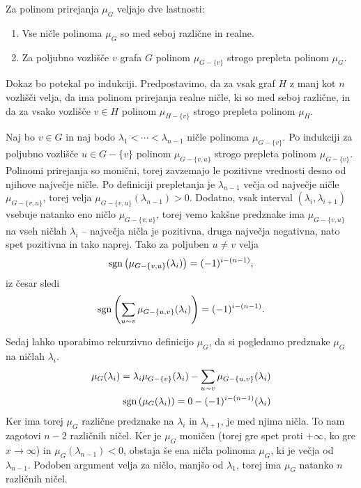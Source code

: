 \begin{izrek}
    Za polinom prirejanja \(\mu_G\) veljajo dve lastnosti:
    \begin{enumerate}
        \item Vse ničle polinoma \(\mu_G\) so med seboj različne in realne.
        \item Za poljubno vozlišče \(v\) grafa \(G\) polinom \(\mu_{G-\{v\}}\) strogo prepleta polinom \(\mu_G\).
    \end{enumerate}
\end{izrek}
\begin{dokaz}
    Dokaz bo potekal po indukciji. Predpostavimo, da za vsak graf \(H\) z manj kot \(n\) vozlišči velja, da ima polinom prirejanja realne ničle, ki so med seboj različne, in da za vsako vozlišče \(v\in H\) polinom \(\mu_{H-\{v\}}\) strogo prepleta polinom \(\mu_H\).

    Naj bo \(v\in G\) in naj bodo \(\lambda_1 < \cdots < \lambda_{n-1}\) ničle polinoma \(\mu_{G-\{v\}}\). Po indukciji za poljubno vozlišče \(u\in G-\{v\}\) polinom \(\mu_{G-\{v, u\}}\) strogo prepleta polinom \(\mu_{G-\{v\}}\). Polinomi prirejanja so monični, torej zavzemajo le pozitivne vrednosti desno od njihove največje ničle. Po definiciji prepletanja je \(\lambda_{n-1}\) večja od največje ničle \(\mu_{G-\{v, u\}}\), torej velja \(\mu_{G-\{v, u\}}(\lambda_{n-1}) > 0\). Dodatno, vsak interval \((\lambda_i, \lambda_{i+1})\) vsebuje natanko eno ničlo \(\mu_{G-\{v, u\}}\), torej vemo kakšne predznake ima \(\mu_{G-\{v, u\}}\) na vseh ničlah \(\lambda_i\) -- največja ničla je pozitivna, druga največja negativna, nato spet pozitivna in tako naprej. Tako za poljuben \(u\neq v\) velja
    \begin{align*}
        \operatorname{sgn}\left({\mu_{G-\{v, u\}}(\lambda_i)}\right) = (-1)^{i-(n-1)},
    \end{align*}
    iz česar sledi
    \begin{align*}
        \operatorname{sgn}\left({\sum_{u\sim v} \mu_{G-\{u, v\}}(\lambda_i)}\right) = (-1)^{i - (n-1)}.
    \end{align*}

    Sedaj lahko uporabimo rekurzivno definicijo \(\mu_G\), da si pogledamo predznake \(\mu_G\) na ničlah \(\lambda_i\).
    \begin{align*}
        \mu_G(\lambda_i) = \lambda_i \mu_{G-\{v\}}(\lambda_i) - \sum_{u\sim v} \mu_{G-\{u, v\}}(\lambda_i) \\
        \operatorname{sgn}\left({\mu_G(\lambda_i)}\right) = 0 - (-1)^{i-(n-1)} (\lambda_i)
    \end{align*}
    Ker ima torej \(\mu_G\) različne predznake na \(\lambda_i\) in \(\lambda_{i+1}\), je med njima ničla. To nam zagotovi \(n-2\) različnih ničel. Ker je \(\mu_G\) moničen (torej gre spet proti \(+\infty\), ko gre \(x\to \infty\)) in \(\mu_G(\lambda_{n-1}) < 0\), obstaja še ena ničla polinoma \(\mu_G\), ki je večja od \(\lambda_{n-1}\). Podoben argument velja za ničlo, manjšo od \(\lambda_1\), torej ima \(\mu_G\) natanko \(n\) različnih ničel.
\end{dokaz}


